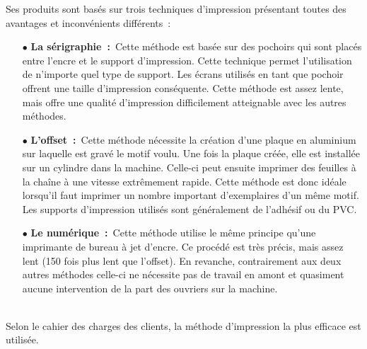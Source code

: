 Ses produits sont basés sur trois techniques d'impression présentant toutes des avantages et inconvénients différents~:~
\\
\begin{itemize}
    \item[\tiny$\bullet$] \textbf{La sérigraphie~:}~Cette méthode est basée sur des pochoirs qui sont placés entre l'encre et le support d'impression.
    Cette technique permet l'utilisation de n'importe quel type de support.
    Les écrans utilisés en tant que pochoir offrent une taille d'impression conséquente.
    Cette méthode est assez lente, mais offre une qualité d'impression difficilement atteignable avec les autres méthodes.
    
    \item[\tiny$\bullet$] \textbf{L'offset~:}~Cette méthode nécessite la création d'une plaque en aluminium sur laquelle est gravé le motif voulu.
    Une fois la plaque créée, elle est installée sur un cylindre dans la machine.
    Celle-ci peut ensuite imprimer des feuilles à la chaîne à une vitesse extrêmement rapide.
    Cette méthode est donc idéale lorsqu'il faut imprimer un nombre important d'exemplaires d'un même motif.
    Les supports d'impression utilisés sont généralement de l'adhésif ou du PVC.
    
    \item[\tiny$\bullet$] \textbf{Le numérique~:}~Cette méthode utilise le même principe qu'une imprimante de bureau à jet d'encre.
    Ce procédé est très précis, mais assez lent (150 fois plus lent que l'offset).
    En revanche, contrairement aux deux autres méthodes celle-ci ne nécessite pas de travail en amont et quasiment aucune intervention de la part des ouvriers sur la machine.
\end{itemize}
~\\

Selon le cahier des charges des clients, la méthode d'impression la plus efficace est utilisée.

